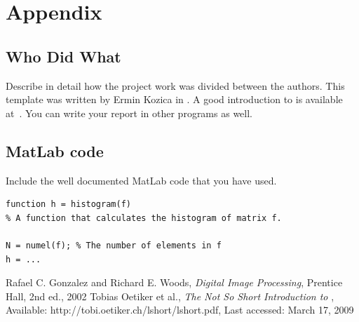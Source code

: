 \documentclass[a4paper]{article}
\begin{document}
\section*{Appendix}

\subsection*{Who Did What}
Describe in detail how the project work was divided between the authors.
This template was written by Ermin Kozica in \LaTeXe. A good introduction to
\LaTeXe is available at~\cite{latexmanual}. You can write your report in other
programs as well.

\subsection*{MatLab code}
Include the well documented MatLab code that you have used.
\begin{verbatim}
function h = histogram(f)
% A function that calculates the histogram of matrix f.

N = numel(f); % The number of elements in f
h = ...
\end{verbatim}


\begin{thebibliography}{99}
 Rafael C. Gonzalez and Richard E. Woods,
  \textsl{Digital Image Processing},
  Prentice Hall, 2nd ed., 2002
 Tobias Oetiker et al.,
  \textsl{The Not So Short Introduction to \LaTeXe},
  Available: http://tobi.oetiker.ch/lshort/lshort.pdf,
  Last accessed: March 17, 2009
\end{thebibliography}
\end{document}
